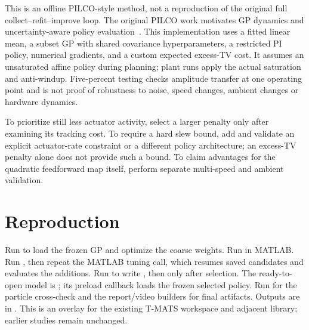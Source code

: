 This is an offline PILCO-style method, not a reproduction of the original full collect--refit--improve loop. The original PILCO work motivates GP dynamics and uncertainty-aware policy evaluation~\cite{pilco}. This implementation uses a fitted linear mean, a subset GP with shared covariance hyperparameters, a restricted PI policy, numerical gradients, and a custom expected excess-TV cost. It assumes an unsaturated affine policy during planning; plant runs apply the actual saturation and anti-windup. Five-percent testing checks amplitude transfer at one operating point and is not proof of robustness to noise, speed changes, ambient changes or hardware dynamics.

To prioritize still less actuator activity, select a larger penalty only after examining its tracking cost. To require a hard slew bound, add and validate an explicit actuator-rate constraint or a different policy architecture; an excess-TV penalty alone does not provide such a bound. To claim advantages for the quadratic feedforward map itself, perform separate multi-speed and ambient validation.

\section{Reproduction}
Run  to load the frozen GP and optimize the coarse weights. Run  in MATLAB. Run , then repeat the MATLAB tuning call, which resumes saved candidates and evaluates the additions. Run  to write , then  only after selection. The ready-to-open model is ; its preload callback loads the frozen selected policy. Run  for the particle cross-check and the report/video builders for final artifacts. Outputs are in . This is an overlay for the existing T-MATS workspace and adjacent library; earlier studies remain unchanged.

